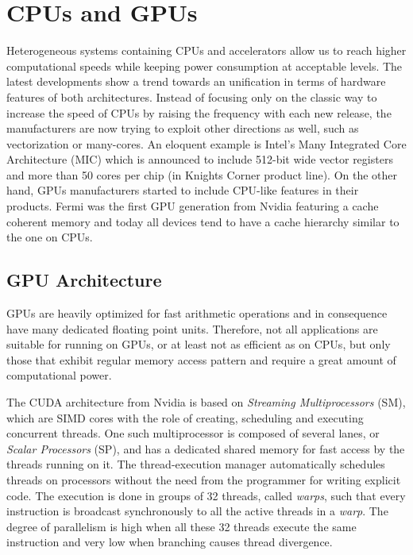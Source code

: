 \section{CPUs and GPUs}
\label{sec:cpus_vs_gpus}
Heterogeneous systems containing CPUs and accelerators allow us to reach higher
computational speeds while keeping power consumption at acceptable levels. The
latest developments show a trend towards an unification in terms of hardware
features of both architectures. Instead of focusing only on the classic way to
increase the speed of CPUs by raising the frequency with each new release, the
manufacturers are now trying to exploit other directions as well, such as
vectorization or many-cores. An eloquent example is Intel's Many Integrated
Core Architecture (MIC) \cite{intel_mic} which is announced to include 512-bit
wide vector registers and more than 50 cores per chip (in Knights Corner product
line). On the other hand, GPUs manufacturers started to include CPU-like
features in their products. Fermi \cite{fermi} was the first GPU generation from
Nvidia featuring a cache coherent memory and today all devices tend to have a
cache hierarchy similar to the one on CPUs.

\subsection{GPU Architecture}

GPUs are heavily optimized for fast arithmetic operations and in consequence
have many dedicated floating point units. Therefore, not all applications are
suitable for running on GPUs, or at least not as efficient as on CPUs, but only
those that exhibit regular memory access pattern and require a great amount of
computational power.

The CUDA architecture from Nvidia is based on \textit{Streaming Multiprocessors}
(SM), which are SIMD cores with the role of creating, scheduling and executing
concurrent threads. One such multiprocessor is composed of several lanes, or
\textit{Scalar Processors} (SP), and has a dedicated shared memory for fast
access by the threads running on it. The thread-execution manager automatically
schedules threads on processors without the need from the programmer for writing
explicit code. The execution is done in groups of 32 threads, called
\textit{warps}, such that every instruction is broadcast synchronously to all
the active threads in a \textit{warp}. The degree of parallelism is high when
all these 32 threads execute the same instruction and very low when branching
causes thread divergence.

